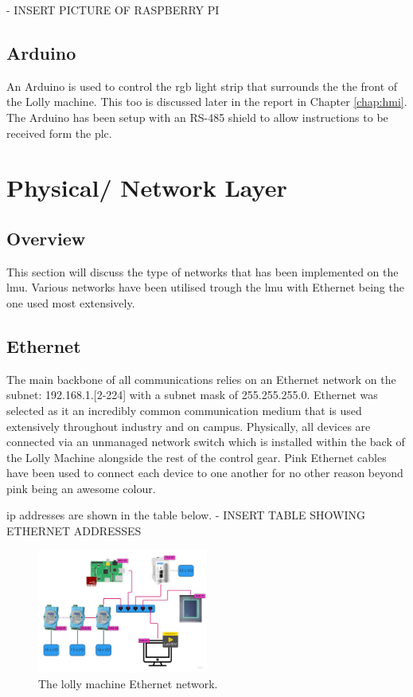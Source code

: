     - INSERT PICTURE OF RASPBERRY PI	
    
    
    \subsection{Arduino}
    An Arduino is used to control the \acrshort{rgb} light strip that surrounds the the front of the Lolly machine. This too is discussed later in the report in Chapter \ref{chap:hmi}. The Arduino has been setup with an RS-485 shield to allow instructions to be received form the \acrshort{plc}.
    
    \section{Physical/ Network Layer}
    
    \subsection{Overview}
    This section will discuss the type of networks that has been implemented on the \acrshort{lmu}. Various networks have been utilised trough the \acrshort{lmu} with Ethernet being the one used most extensively.
    
    \subsection{Ethernet} 
    The main backbone of all communications relies on an Ethernet network on the subnet: 192.168.1.[2-224] with a subnet mask of 255.255.255.0. Ethernet was selected as it an incredibly common communication medium that is used extensively throughout industry and on campus. Physically, all devices are connected via an unmanaged network switch which is installed within the back of the Lolly Machine alongside the rest of the control gear. Pink Ethernet cables have been used to connect each device to one another for no other reason beyond pink being an awesome colour.
    
    \acrshort{ip} addresses are shown in the table below.
    - INSERT TABLE SHOWING ETHERNET ADDRESSES	

        \begin{figure}[H]
            \centering
            \includegraphics[width = 0.5\textwidth]{2_images/ethernetLollyMachine.png}
            \caption{The lolly machine Ethernet network.}
            \label{fig:ethernetLollyMachine}
        \end{figure}
    
